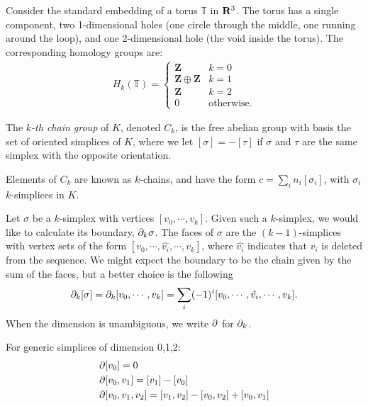 \begin{example}
Consider the standard embedding of a torus $\mathbb{T}$ in $\mathbf{R}^3$. The torus has a single component, two 1-dimensional holes (one circle through the middle, one running around the loop), and one 2-dimensional hole (the void inside the torus). The corresponding homology groups are:
\begin{align*}
  H_k(\mathbb{T}) = \begin{cases}
    \mathbf{Z} & k = 0 \\
    \mathbf{Z} \oplus \mathbf{Z} & k = 1 \\
    \mathbf{Z} & k = 2 \\
    0 & \text{otherwise.}
\end{cases}
\end{align*}
\end{example}

\begin{definition}
The \emph{$k$-th chain group} of $K$, denoted $C_k$, is the free abelian group with basis the set of oriented simplices of $K$, where we let $[\sigma] = -[\tau]$ if $\sigma$ and $\tau$ are the same simplex with the opposite orientation.
\end{definition}

Elements of $C_k$ are known as $k$-chains, and have the form $c = \sum_i n_i [\sigma_i]$, with $\sigma_i$ $k$-simplices in $K$.

Let $\sigma$ be a $k$-simplex with vertices $[v_0, \cdots, v_k]$. Given such a $k$-simplex, we would like to calculate its boundary, $\partial_k \sigma$. The faces of $\sigma$ are the $(k-1)$-simplices with vertex sets of the form $[v_0, \cdots, \hat{v_i}, \cdots, v_k]$, where $\hat{v_i}$ indicates that $v_i$ is deleted from the sequence. We might expect the boundary to be the chain given by the sum of the faces, but a better choice is the following
\begin{align*}
\partial_k[\sigma] = \partial_k[v_0, \cdots, v_k] = \sum_i (-1)^i [v_0, \cdots, \hat{v_i}, \cdots, v_k].
\end{align*}
When the dimension is unambiguous, we write $\partial$ for $\partial_k$.

\begin{example}
For generic simplices of dimension 0,1,2:
\begin{align*}
  &\partial[v_0] = 0 \\
  &\partial[v_0, v_1] = [v_1] - [v_0] \\
  &\partial[v_0, v_1, v_2] = [v_1, v_2] - [v_0, v_2] + [v_0, v_1]
\end{align*}
\end{example}

